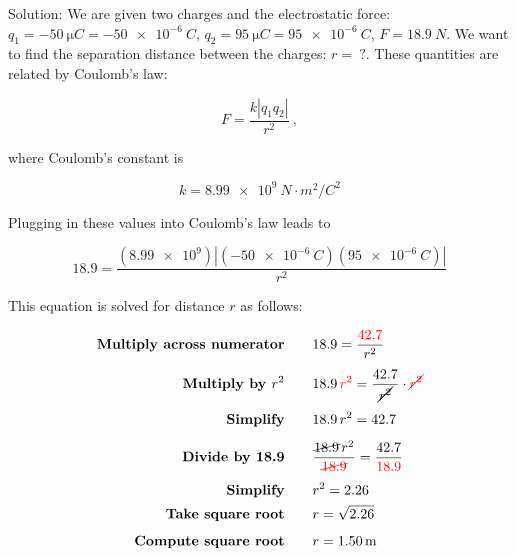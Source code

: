 \documentclass[dvipsnames]{article}
\begin{document}
\begin{center}
\end{center}

Solution: We are given two charges and the electrostatic force: $q_1 = \SI{-50}{\micro C} = \qty{-50e-6}{C}$, $q_2 = \SI{95}{\micro C} = \qty{95e-6}{C}$, $F = \SI{18.9}{N}$. We want to find the separation distance between the charges: $r =\ ?$. These quantities are related by Coulomb's law:

\begin{equation*}
F = \frac{k |q_1 q_2|}{r^2}\ ,
\end{equation*}

where Coulomb's constant is

\begin{equation*}
k = \SI{8.99e9}{N \cdot m^2/C^2}
\end{equation*}

Plugging in these values into Coulomb's law leads to 

\begin{equation*}
18.9 = \frac{(\num{8.99e9}) \left|(\qty{-50e-6}{C})(\qty{95e-6}{C})\right|}{r^2}
\end{equation*} 

This equation is solved for distance $r$ as follows:

\begin{align*}
\textbf{Multiply across numerator} \qquad & 18.9 = \frac{\textcolor{red}{42.7}}{r^2}\\[1ex]
\textbf{Multiply by $r^2$} \qquad & 18.9\,\textcolor{red}{r^2} = \frac{42.7}{\cancel{r^2}} \cdot \textcolor{red}{\cancel{r^2}}\\[1ex]
\textbf{Simplify} \qquad & 18.9\,r^2 = 42.7\\[1ex]
\textbf{Divide by 18.9} \qquad & \frac{\cancel{18.9}\,r^2}{\textcolor{red}{\cancel{18.9}}} = \frac{42.7}{\textcolor{red}{18.9}}\\[1ex]
\textbf{Simplify} \qquad & r^2 = 2.26\\
\textbf{Take square root} \qquad & r = \sqrt{2.26}\\[1ex]
\textbf{Compute square root} \qquad & r = \qty{1.50}{m}\\ 
\end{align*}
\end{document}
